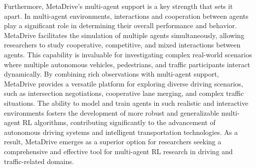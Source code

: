 Furthermore, MetaDrive's multi-agent support is a key strength that sets it apart. In multi-agent environments, interactions and cooperation between agents play a significant role in determining their overall performance and behavior. MetaDrive facilitates the simulation of multiple agents simultaneously, allowing researchers to study cooperative, competitive, and mixed interactions between agents. This capability is invaluable for investigating complex real-world scenarios where multiple autonomous vehicles, pedestrians, and traffic participants interact dynamically.
By combining rich observations with multi-agent support, MetaDrive provides a versatile platform for exploring diverse driving scenarios, such as intersection negotiations, cooperative lane merging, and complex traffic situations. The ability to model and train agents in such realistic and interactive environments fosters the development of more robust and generalizable multi-agent RL algorithms, contributing significantly to the advancement of autonomous driving systems and intelligent transportation technologies. As a result, MetaDrive emerges as a superior option for researchers seeking a comprehensive and effective tool for multi-agent RL research in driving and traffic-related domains.





